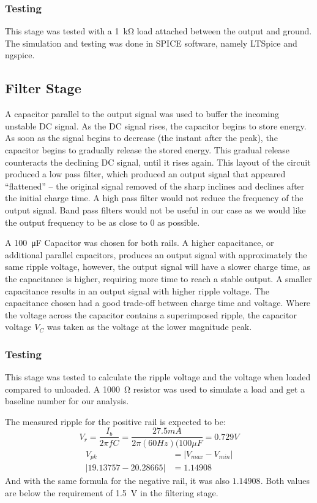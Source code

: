 \documentclass[12pt]{article}
\begin{document}
\subsubsection{Testing}
This stage was tested with a \SI{1}{\kilo\ohm} load attached between the output and ground. The simulation and testing was done in SPICE software, namely LTSpice and ngspice.

\subsection{Filter Stage}
A capacitor parallel to the output signal was used to buffer the incoming unstable DC signal. As the DC signal rises, the capacitor begins to store energy. As soon as the signal begins to decrease (the instant after the peak), the capacitor begins to gradually release the stored energy. This gradual release counteracts the declining DC signal, until it rises again. This layout of the circuit produced a low pass filter, which produced an output signal that appeared ``flattened'' -- the original signal removed of the sharp inclines and declines after the initial charge time. A high pass filter would not reduce the frequency of the output signal. Band pass filters would not be useful in our case as we would like the output frequency to be as close to 0 as possible.

A \SI{100}{\micro\farad} Capacitor was chosen for both rails. A higher capacitance, or additional parallel capacitors, produces an output signal with approximately the same ripple voltage, however, the output signal will have a slower charge time, as the capacitance is higher, requiring more time to reach a stable output. A smaller capacitance results in an output signal with higher ripple voltage. The capacitance chosen had a good trade-off between charge time and voltage. Where the voltage across the capacitor contains a superimposed ripple, the capacitor voltage $V_C$ was taken as the voltage at the lower magnitude peak.

\subsubsection{Testing}

This stage was tested to calculate the ripple voltage and the voltage when loaded compared to unloaded. A \SI{1000}{\ohm} resistor was used to simulate a load and get a baseline number for our analysis.

The measured ripple for the positive rail is expected to be:
$$V_r = \frac{I_b}{2\pi f C} = \frac{27.5mA}{2\pi (60Hz)(100\mu F} = 0.729V$$
\begin{align*}
    V_{pk} &= \left|V_{max} - V_{min}\right|\\
    \left|19.13757 - 20.28665\right| &= 1.14908
\end{align*}
And with the same formula for the negative rail, it was also \(1.14908\). Both values are below the requirement of \SI{1.5}{\volt} in the filtering stage.
\end{document}
